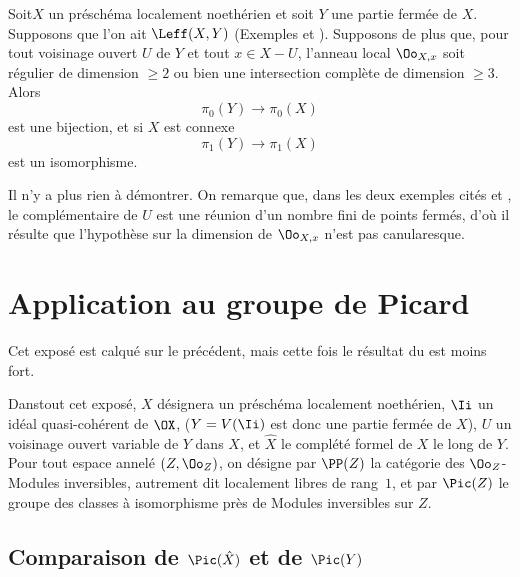 \begin{theoreme} \label{X.3.10}
Soit\pageoriginale $X$ un pr\'esch\'ema localement noeth\'erien et soit $Y$ une partie ferm\'ee de $X$. Supposons que l'on ait $\Leff(X, Y)$ (\cf Exemples  et ). Supposons de plus que, pour tout voisinage ouvert $U$ de $Y$ et tout $x\in X-U$, l'anneau local $\Oo_{X, x}$ soit r\'egulier de dimension $\geq2$ ou bien une intersection compl\`ete de dimension $\geq3$. Alors
\[
\pi_0(Y) \to \pi_0(X)
\]
est une bijection, et si $X$ est connexe
\[
\pi_1(Y) \to \pi_1(X)
\]
est un isomorphisme.
\end{theoreme}

Il n'y a plus rien \`a d\'emontrer. On remarque que, dans les deux exemples cit\'es  et , le compl\'ementaire de $U$ est une r\'eunion d'un nombre fini de points ferm\'es, d'o\`u il r\'esulte que l'hypoth\`ese sur la dimension de $\Oo_{X, x}$ n'est pas canularesque.


\chapter{Application au groupe de Picard} \label{XI}

Cet expos\'e est calqu\'e sur le pr\'ec\'edent, mais cette fois le r\'esultat du \numero {} est moins fort.

Dans\pageoriginale tout cet expos\'e, $X$ d\'esignera un pr\'esch\'ema localement noeth\'erien, $\Ii$ un id\'eal quasi-coh\'erent de $\OX$, ($Y=V(\Ii)$ est donc une partie ferm\'ee de $X$), $U$ un voisinage ouvert variable de $Y$ dans $X$, et $\hat X$ le compl\'et\'e formel de $X$ le long de $Y$. Pour tout espace annel\'e $(Z, \Oo_Z)$, on d\'esigne par $\PP(Z)$\label{pXI.1} la cat\'egorie des $\Oo_Z$-Modules inversibles, autrement dit localement libres de rang~$1$, et par $\Pic(Z)$ le groupe des classes \`a isomorphisme pr\`es de Modules inversibles sur $Z$.

\section{Comparaison de $\Pic(\hat X)$ et de $\Pic(Y)$} \label{XI.1}

